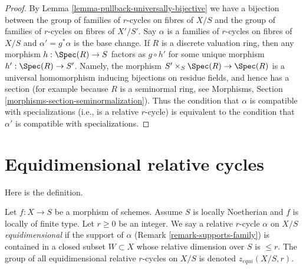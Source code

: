 \begin{proof}
By Lemma \ref{lemma-pullback-universally-bijective} we have a bijection
between the group of families of $r$-cycles on fibres of $X/S$ and
the group of families of $r$-cycles on fibres of $X'/S'$.
Say $\alpha$ is a families of $r$-cycles on fibres of $X/S$ and
$\alpha' = g^*\alpha$ is the base change.
If $R$ is a discrete valuation ring, then any morphism
$h : \Spec(R) \to S$ factors as $g \circ h'$ for some
unique morphism $h' : \Spec(R) \to S'$.
Namely, the morphism $S' \times_S \Spec(R) \to \Spec(R)$ is
a universal homomorphism inducing bijections on residue fields,
and hence has a section (for example because $R$ is a seminormal
ring, see Morphisms, Section \ref{morphisms-section-seminormalization}).
Thus the condition that $\alpha$ is compatible with
specializations (i.e., is a relative $r$-cycle)
is equivalent to the condition that
$\alpha'$ is compatible with specializations.
\end{proof}






\section{Equidimensional relative cycles}
\label{section-equidimensional}

\noindent
Here is the definition.

\begin{definition}
\label{definition-equidimensional}
Let $f : X \to S$ be a morphism of schemes. Assume $S$ is locally Noetherian
and $f$ is locally of finite type. Let $r \geq 0$ be an integer. We say a
relative $r$-cycle $\alpha$ on $X/S$ {\it equidimensional} if the support
of $\alpha$ (Remark \ref{remark-supports-family})
is contained in a closed subset $W \subset X$ whose relative
dimension over $S$ is $\leq r$.
The group of all equidimensional relative $r$-cycles on $X/S$ is
denoted $z_{equi}(X/S, r)$.
\end{definition}


